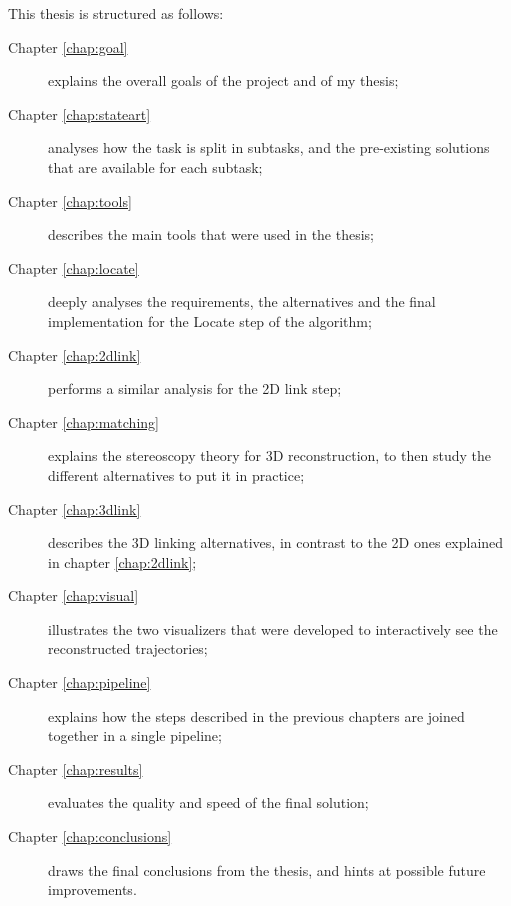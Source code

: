 

\newcommand{\structuretype}{description}
\newcommand{\structureitem}[2]{\item[Chapter #1] #2}

This thesis is structured as follows:

\begin{\structuretype}
	\structureitem{\ref{chap:goal}}{explains the overall goals of the project and of my thesis;}
	\structureitem{\ref{chap:stateart}}{analyses how the task is split in subtasks, and the pre-existing solutions that are available for each subtask;}
	\structureitem{\ref{chap:tools}}{describes the main tools that were used in the thesis;}
	\structureitem{\ref{chap:locate}}{deeply analyses the requirements, the alternatives and the final implementation for the Locate step of the algorithm;}
	\structureitem{\ref{chap:2dlink}}{performs a similar analysis for the 2D link step;}
	\structureitem{\ref{chap:matching}}{explains the stereoscopy theory for 3D reconstruction, to then study the different alternatives to put it in practice;}
	\structureitem{\ref{chap:3dlink}}{describes the 3D linking alternatives, in contrast to the 2D ones explained in chapter \ref{chap:2dlink};}
	\structureitem{\ref{chap:visual}}{illustrates the two visualizers that were developed to interactively see the reconstructed trajectories;}
	\structureitem{\ref{chap:pipeline}}{explains how the steps described in the previous chapters are joined together in a single pipeline;}
	\structureitem{\ref{chap:results}}{evaluates the quality and speed of the final solution;}
	\structureitem{\ref{chap:conclusions}}{draws the final conclusions from the thesis, and hints at possible future improvements.}
\end{\structuretype}
